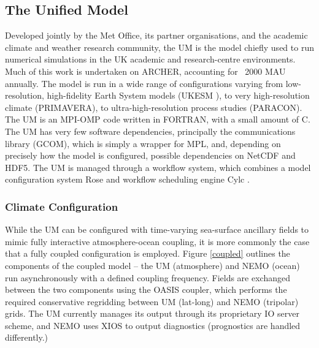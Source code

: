 \documentclass[twocolumn, 5p, times]{elsarticle}
\begin{document}
\subsection{The Unified Model}

Developed jointly by the Met Office, its partner organisations, and the academic climate and weather research community, the UM is the model chiefly used to run numerical simulations in the UK academic and research-centre environments. Much of this work is undertaken on ARCHER, accounting for ~2000 MAU annually. The model is run in a wide range of configurations varying from low-resolution, high-fidelity Earth System models (UKESM \cite{Ukesm}), to very high-resolution climate (PRIMAVERA), to ultra-high-resolution process studies (PARACON). The UM is an MPI-OMP code written in FORTRAN, with a small amount of C. The UM has very few software dependencies, principally the communications library (GCOM), which is simply a wrapper for MPL, and, depending on precisely how the model is configured, possible dependencies on NetCDF and HDF5. The UM is managed through a workflow system, which combines a model configuration system Rose \cite{Rose} and workflow scheduling engine Cylc \cite{Cylc}.

\subsubsection{Climate Configuration}
While the UM can be configured with time-varying sea-surface ancillary fields to mimic fully interactive atmosphere-ocean coupling, it is more commonly the case that a fully coupled configuration is employed. Figure \ref{coupled} outlines the components of the coupled model -- the UM (atmosphere) and NEMO (ocean) run asynchronously with a defined coupling frequency. Fields are exchanged between the two components using the OASIS coupler, which performs the required conservative regridding between UM (lat-long) and NEMO (tripolar) grids. The UM currently manages its output through its proprietary IO server scheme, and NEMO uses XIOS to output diagnostics (prognostics are handled differently.)
\end{document}
